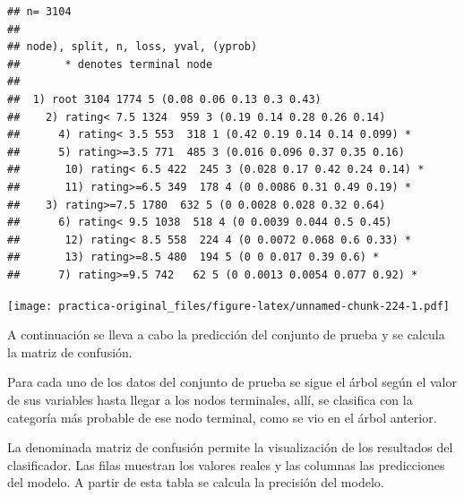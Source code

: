 \documentclass[spanish,]{article}
\newenvironment{Shaded}{\begin{snugshade}}{\end{snugshade}}
\newcommand{\KeywordTok}[1]{\textcolor[rgb]{0.13,0.29,0.53}{\textbf{#1}}}
\newcommand{\DataTypeTok}[1]{\textcolor[rgb]{0.13,0.29,0.53}{#1}}
\newcommand{\StringTok}[1]{\textcolor[rgb]{0.31,0.60,0.02}{#1}}
\newcommand{\CommentTok}[1]{\textcolor[rgb]{0.56,0.35,0.01}{\textit{#1}}}
\newcommand{\OperatorTok}[1]{\textcolor[rgb]{0.81,0.36,0.00}{\textbf{#1}}}
\newcommand{\NormalTok}[1]{#1}
\begin{document}
\begin{verbatim}
## n= 3104 
## 
## node), split, n, loss, yval, (yprob)
##       * denotes terminal node
## 
##  1) root 3104 1774 5 (0.08 0.06 0.13 0.3 0.43)  
##    2) rating< 7.5 1324  959 3 (0.19 0.14 0.28 0.26 0.14)  
##      4) rating< 3.5 553  318 1 (0.42 0.19 0.14 0.14 0.099) *
##      5) rating>=3.5 771  485 3 (0.016 0.096 0.37 0.35 0.16)  
##       10) rating< 6.5 422  245 3 (0.028 0.17 0.42 0.24 0.14) *
##       11) rating>=6.5 349  178 4 (0 0.0086 0.31 0.49 0.19) *
##    3) rating>=7.5 1780  632 5 (0 0.0028 0.028 0.32 0.64)  
##      6) rating< 9.5 1038  518 4 (0 0.0039 0.044 0.5 0.45)  
##       12) rating< 8.5 558  224 4 (0 0.0072 0.068 0.6 0.33) *
##       13) rating>=8.5 480  194 5 (0 0 0.017 0.39 0.6) *
##      7) rating>=9.5 742   62 5 (0 0.0013 0.0054 0.077 0.92) *
\end{verbatim}

\begin{Shaded}
\end{Shaded}

\texttt{[image: practica-original\_files/figure-latex/unnamed-chunk-224-1.pdf]}

A continuación se lleva a cabo la predicción del conjunto de prueba y se
calcula la matriz de confusión.

Para cada uno de los datos del conjunto de prueba se sigue el árbol
según el valor de sus variables hasta llegar a los nodos terminales,
allí, se clasifica con la categoría más probable de ese nodo terminal,
como se vio en el árbol anterior.

La denominada matriz de confusión permite la visualización de los
resultados del clasificador. Las filas muestran los valores reales y las
columnas las predicciones del modelo. A partir de esta tabla se calcula
la precisión del modelo.

\begin{Shaded}
\end{Shaded}
\end{document}
